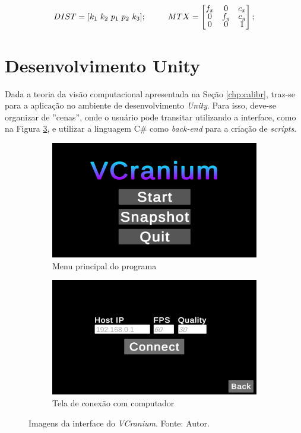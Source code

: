 \[ DIST = [ k_1 \ k_2 \ p_1 \ p_2 \ k_3 ]; \ \ \ \ \ \ \ \
MTX = 
\renewcommand\arraystretch{.8}
\begin{bmatrix}
    f_x & 0 & c_x \\
    0 & f_y & c_y \\
    0 & 0 & 1
\end{bmatrix};\]

\section{Desenvolvimento Unity}

Dada a teoria da visão computacional apresentada na Seção \ref{chp:calibr}, traz-se para a aplicação no ambiente de desenvolvimento \textit{Unity}. Para isso, deve-se organizar de ''cenas'', onde o usuário pode transitar utilizando a interface, como na Figura \ref{fig:ui1}, e utilizar a linguagem C\# como \textit{back-end} para a criação de \textit{scripts}.

\begin{figure}[ht]
    \centering
        \begin{subfigure}{.45\textwidth}
            \centering
            \includegraphics[width=.95\linewidth]{figuras/vcranium_main.png}
            \caption{Menu principal do programa}
            \label{fig:vcranium-connect}
        \end{subfigure}
        \begin{subfigure}{.45\textwidth}
            \centering
            \includegraphics[width=.95\linewidth]{figuras/vcranium_connect.png}
            \caption{Tela de conexão com computador}
            \label{fig:vcranium2-connect}
        \end{subfigure}
        \caption{Imagens da interface do \textit{VCranium}. Fonte: Autor.}
        \label{fig:ui1}
\end{figure}

